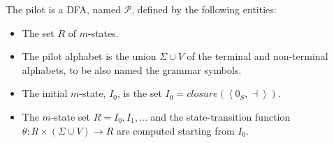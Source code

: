 \documentclass[12pt, a4paper]{report}
\newtheorem[style=M,bodystyle=\normalfont]{operation}{Operation}
\newtheorem[style=M,bodystyle=\normalfont]{theorem}{Theorem}
\newtheorem[style=M,bodystyle=\normalfont]{corollary}{Corollary}
\newtheorem[style=M,bodystyle=\normalfont]{lemma}{Lemma}
\newtheorem[style=M,bodystyle=\normalfont]{definition}{Definition}
\begin{document}
    The pilot is a DFA, named $\mathcal{P}$, defined by the following entities:
    \begin{itemize}
        \item The set $R$ of $m$-states. 
        \item The pilot alphabet is the union $\Sigma\cup V$ of the terminal and non-terminal alphabets, to be also named the grammar symbols.
        \item The initial $m$-state, $I_0$, is the set $I_0=closure(\left\langle 0_S,\dashv \right\rangle )$. 
        \item The $m$-state set $R={I_0,I_1,\dots}$ and the state-transition function $\theta:R \times (\Sigma \cup V) \rightarrow R$ are computed starting from $I_0$. 
    \end{itemize}

    
    
\end{document}

